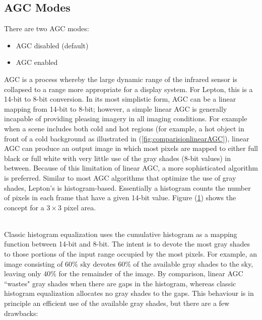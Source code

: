 \subsection{AGC Modes}
\label{ssec:AGCModes}
There are two AGC modes:
\begin{itemize}
    \item AGC disabled (default)
    \item AGC enabled
\end{itemize}
AGC is a process whereby the large dynamic range of the infrared sensor is
collapsed to a range more appropriate for a display system. For Lepton, this is
a 14-bit to 8-bit conversion.\hfill \break
In its most simplistic form, AGC can be a linear mapping from 14-bit to 8-bit; 
however, a simple linear AGC is generally incapable of providing pleasing imagery 
in all imaging conditions. 
For example when a scene includes both cold and hot regions (for example, a hot 
object in front of a cold background as illustrated in (\ref{fig:comparisionlinearAGC}),
linear AGC can produce an output image in which most pixels are mapped to either
full black or full white with very little use of the gray shades (8-bit values)
in between. Because of this limitation of linear AGC, a more sophisticated
algorithm is preferred. Similar to most AGC algorithms that optimize the use of
gray shades, Lepton's is histogram-based. Essentially a histogram counts the
number of pixels in each frame that have a given 14-bit value. 
Figure (\ref{fig:histogram}) shows the concept for a $3 \times 3$ pixel area.\hfill \break
%
\begin{figure}[!h]
    \centering
    \resizebox{0.80\textwidth}{!}{}
    \label{fig:histogram}
\end{figure}
%
\newpage
\noindent \\Classic histogram equalization uses the cumulative histogram as a
mapping function between 14-bit and 8-bit. The intent is to devote the most gray
shades to those portions of the input range occupied by the most pixels. For
example, an image consisting of $60 \%$ sky devotes $60 \%$ of the available
gray shades to the sky, leaving only $40 \%$ for the remainder of the image. By
comparison, linear AGC ``wastes" gray shades when there are gaps in the
histogram, whereas classic histogram equalization allocates no gray shades to
the gaps. This behaviour is in principle an efficient use of the available gray
shades, but there are a few drawbacks:

